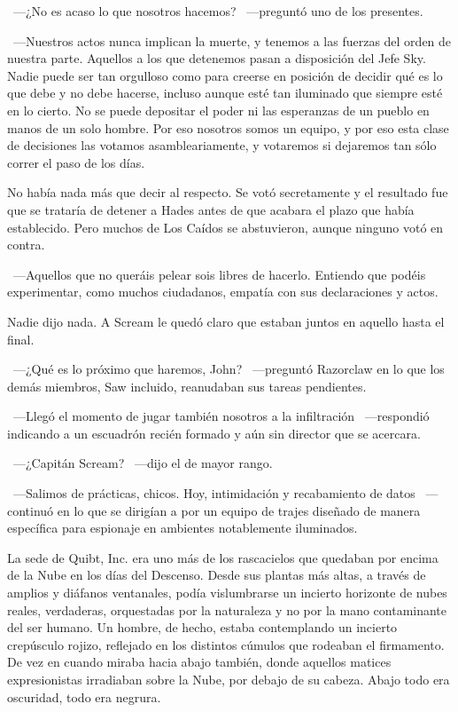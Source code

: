 ~---¿No es acaso lo que nosotros hacemos? ~---preguntó uno de los presentes.

~---Nuestros actos nunca implican la muerte, y tenemos a las fuerzas del orden de nuestra parte. Aquellos a los que detenemos pasan a disposición del Jefe Sky. Nadie puede ser tan orgulloso como para creerse en posición de decidir qué es lo que debe y no debe hacerse, incluso aunque esté tan iluminado que siempre esté en lo cierto. No se puede depositar el poder ni las esperanzas de un pueblo en manos de un solo hombre. Por eso nosotros somos un equipo, y por eso esta clase de decisiones las votamos asambleariamente, y votaremos si dejaremos tan sólo correr el paso de los días.

No había nada más que decir al respecto. Se votó secretamente y el resultado fue que se trataría de detener a Hades antes de que acabara el plazo que había establecido. Pero muchos de Los Caídos se abstuvieron, aunque ninguno votó en contra.

~---Aquellos que no queráis pelear sois libres de hacerlo. Entiendo que podéis experimentar, como muchos ciudadanos, empatía con sus declaraciones y actos.

Nadie dijo nada. A Scream le quedó claro que estaban juntos en aquello hasta el final.

~---¿Qué es lo próximo que haremos, John? ~---preguntó Razorclaw en lo que los demás miembros, Saw incluido, reanudaban sus tareas pendientes.

~---Llegó el momento de jugar también nosotros a la infiltración ~---respondió indicando a un escuadrón recién formado y aún sin director que se acercara.

~---¿Capitán Scream? ~---dijo el de mayor rango.

~---Salimos de prácticas, chicos. Hoy, intimidación y recabamiento de datos ~---continuó en lo que se dirigían a por un equipo de trajes diseñado de manera específica para espionaje en ambientes notablemente iluminados.
 
\parbreak
La sede de Quibt, Inc. era uno más de los rascacielos que quedaban por encima de la Nube en los días del Descenso. Desde sus plantas más altas, a través de amplios y diáfanos ventanales, podía vislumbrarse un incierto horizonte de nubes reales, verdaderas, orquestadas por la naturaleza y no por la mano contaminante del ser humano. Un hombre, de hecho, estaba contemplando un incierto crepúsculo rojizo, reflejado en los distintos cúmulos que rodeaban el firmamento. De vez en cuando miraba hacia abajo también, donde aquellos matices expresionistas irradiaban sobre la Nube, por debajo de su cabeza. Abajo todo era oscuridad, todo era negrura.

